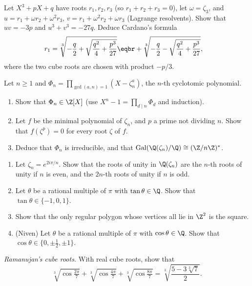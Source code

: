 \begin{exercise}[$\star\star$]\label{ex:cardano}
Let $X^3+pX+q$ have roots $r_1,r_2,r_3$ (so $r_1+r_2+r_3=0$), let $\omega=\zeta_3$, and $u=r_1+\omega r_2+\omega^2r_3$, $v=r_1+\omega^2r_2+\omega r_3$ (Lagrange resolvents). Show that $uv=-3p$ and $u^3+v^3=-27q$. Deduce Cardano's formula
\[
\begin{aligned}r_1&=\sqrt[3]{-\frac q2+\sqrt{\frac{q^2}4+\frac{p^3}{27}}}\eqbr+\sqrt[3]{-\frac q2-\sqrt{\frac{q^2}4+\frac{p^3}{27}}},\end{aligned}
\]
where the two cube roots are chosen with product $-p/3$.
\end{exercise}

\begin{exercise}[$\star\star\star$]\label{ex:phin}
Let $n\ge1$ and $\Phi_n=\prod_{\gcd(a,n)=1}(X-\zeta_n^a)$, the $n$-th cyclotomic polynomial.
\begin{enumerate}[label=(\alph*)]
\item Show that $\Phi_n\in\Z[X]$ (use $X^n-1=\prod_{d\mid n}\Phi_d$ and induction).
\item Let $f$ be the minimal polynomial of $\zeta_n$, and $p$ a prime not dividing $n$. Show that $f(\zeta^p)=0$ for every root $\zeta$ of $f$.
\item Deduce that $\Phi_n$ is irreducible, and that $\operatorname{Gal}(\Q(\zeta_n)/\Q)\cong(\Z/n\Z)^*$.
\end{enumerate}
\end{exercise}

\begin{exercise}[$\star\star$]\label{pb:rattan}
\begin{enumerate}[label=(\alph*)]
\item Let $\zeta_n=e^{2i\pi/n}$. Show that the roots of unity in $\Q(\zeta_n)$ are the $n$-th roots of unity if $n$ is
even, and the $2n$-th roots of unity if $n$ is odd.
\item Let $\theta$ be a rational multiple of $\pi$ with $\tan\theta\in\Q$. Show that $\tan\theta\in\{-1,0,1\}$.
\item Show that the only regular polygon whose vertices all lie in $\Z^2$ is the square.
\item (Niven) Let $\theta$ be a rational multiple of $\pi$ with $\cos\theta\in\Q$. Show that
$\cos\theta\in\{0,\pm\frac12,\pm1\}$.
\end{enumerate}
\end{exercise}

\begin{exercise}[$\star\star\star$]\label{pb:ramacube}
\emph{Ramanujan's cube roots.} With real cube roots, show that
\[
\sqrt[3]{\cos\tfrac{2\pi}7}+\sqrt[3]{\cos\tfrac{4\pi}7}+\sqrt[3]{\cos\tfrac{8\pi}7}=\sqrt[3]{\frac{5-3\sqrt[3]7}2}.
\]
\end{exercise}


